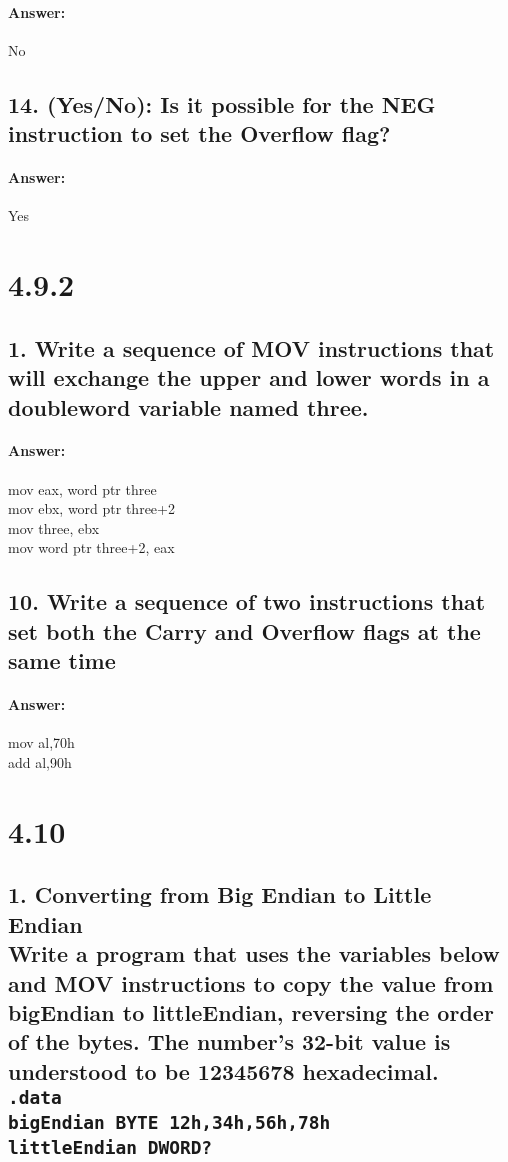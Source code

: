 \documentclass[12pt]{article}
\begin{document}
\paragraph{Answer: } No

\subsection*{14. \normalsize (Yes/No): Is it possible for the NEG instruction to set the Overflow flag?}
\paragraph{Answer: }Yes

\section*{4.9.2}

\subsection*{1. \normalsize Write a sequence of MOV instructions that will exchange the upper and lower words in a doubleword variable named three.}
\paragraph{Answer: } 
	mov eax, word ptr three \\
	mov ebx, word ptr three+2 \\
	mov three, ebx \\
	mov word ptr three+2, eax \\

\subsection*{10. \normalsize Write a sequence of two instructions that set both the Carry and Overflow flags at the same time}
\paragraph{Answer: } 
	mov al,70h \\
	add al,90h \\

\section*{4.10}

\subsection*{1. Converting from Big Endian to Little Endian \\ 
	\normalsize Write a program that uses the variables below and MOV instructions to copy the value from bigEndian to littleEndian, reversing the order of the bytes. The number’s 32-bit value is understood
	to be 12345678 hexadecimal. \\
\texttt{.data \\
	bigEndian BYTE 12h,34h,56h,78h \\
	littleEndian DWORD?}}
\end{document}
